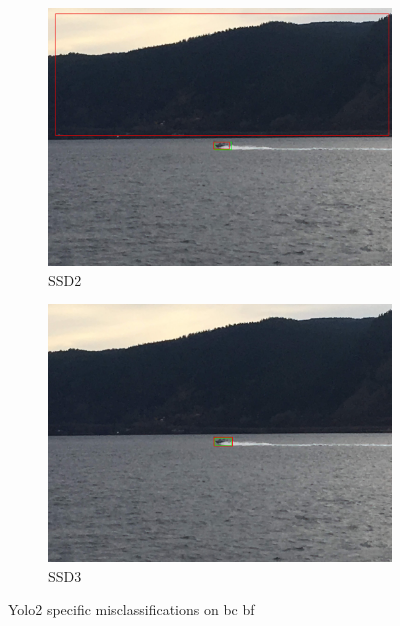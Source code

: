\begin{figure}[h!]
\begin{subfigure}{.5\textwidth}
  \centering
  \includegraphics[width=0.75\linewidth]{results/case_buildings/ssdtrf/ssd2/grov2/IMG_2325.jpg}
  \caption{SSD2}
\end{subfigure}%
\begin{subfigure}{.5\textwidth}
  \centering
  \includegraphics[width=.75\linewidth]{results/case_buildings/ssdtrf/ssd3/grov2/IMG_2325.jpg}
  \caption{SSD3}
\end{subfigure}
\caption{Yolo2 specific misclassifications on bc bf}
\label{img:yolo2_misclas}


\end{figure}
